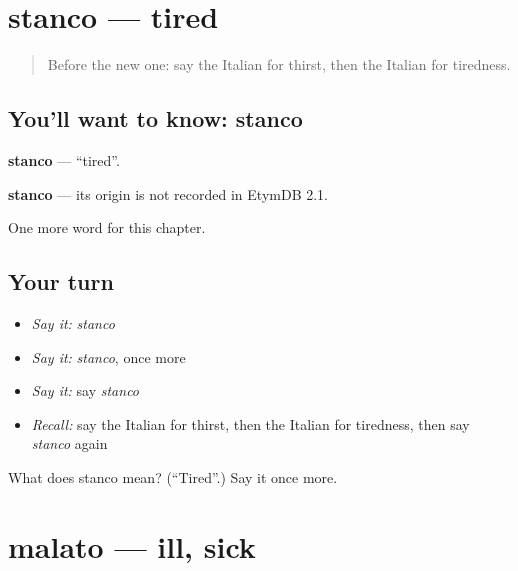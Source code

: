 \section[stanco]{stanco — tired}

\label{lesson:IT-C42-stanco}



\begin{quote}
Before the new one: say the Italian for thirst, then the Italian for tiredness.
\end{quote}

\subsection*{You'll want to know: stanco}
\textbf{stanco} — \textquotedblleft{}tired\textquotedblright{}.

\begin{cousinweb}
\textbf{stanco} — its origin is not recorded in EtymDB 2.1.
\end{cousinweb}

\begin{grammarlens}[title={What you've built}]
One more word for this chapter.
\end{grammarlens}

\subsection*{Your turn}
\begin{itemize}
\raggedright
  \item \emph{Say it:} \emph{stanco}
  \item \emph{Say it:} \emph{stanco}, once more
  \item \emph{Say it:} say \emph{stanco}
  \item \emph{Recall:} say the Italian for thirst, then the Italian for tiredness, then say \emph{stanco} again
\end{itemize}

\begin{tcolorbox}[breakable,colback=teal!4,colframe=teal!35!black,title={Before you move on}]
What does stanco mean? (\textquotedblleft{}Tired\textquotedblright{}.) Say it once more.
\end{tcolorbox}
\section[malato]{malato — ill, sick}

\label{lesson:IT-C42-malato}



